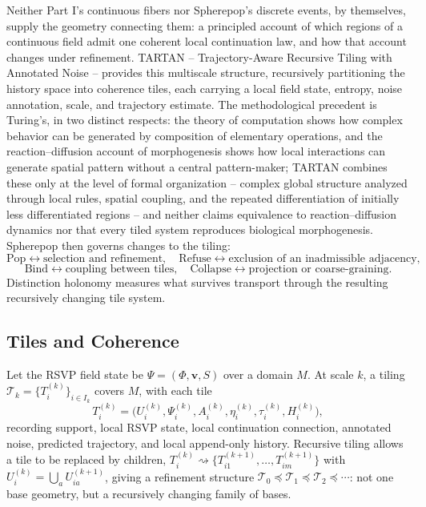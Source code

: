 \documentclass[11pt]{article}
\newcommand{\Pop}{\mathrm{Pop}}
\newcommand{\Refuse}{\mathrm{Refuse}}
\newcommand{\Bind}{\mathrm{Bind}}
\newcommand{\Collapse}{\mathrm{Collapse}}
\begin{document}
Neither Part I's continuous fibers nor Spherepop's discrete events, by themselves, supply the geometry connecting them: a principled account of which regions of a continuous field admit one coherent local continuation law, and how that account changes under refinement. TARTAN -- Trajectory-Aware Recursive Tiling with Annotated Noise -- provides this multiscale structure, recursively partitioning the history space into coherence tiles, each carrying a local field state, entropy, noise annotation, scale, and trajectory estimate. The methodological precedent is Turing's, in two distinct respects: the theory of computation shows how complex behavior can be generated by composition of elementary operations, and the reaction--diffusion account of morphogenesis shows how local interactions can generate spatial pattern without a central pattern-maker; TARTAN combines these only at the level of formal organization -- complex global structure analyzed through local rules, spatial coupling, and the repeated differentiation of initially less differentiated regions -- and neither claims equivalence to reaction--diffusion dynamics nor that every tiled system reproduces biological morphogenesis. Spherepop then governs changes to the tiling:
\[
\Pop \leftrightarrow \text{selection and refinement}, \quad \Refuse \leftrightarrow \text{exclusion of an inadmissible adjacency},
\]
\[
\Bind \leftrightarrow \text{coupling between tiles}, \quad \Collapse \leftrightarrow \text{projection or coarse-graining}.
\]
Distinction holonomy measures what survives transport through the resulting recursively changing tile system.

\subsection{Tiles and Coherence}

Let the RSVP field state be $\Psi = (\Phi, \mathbf{v}, S)$ over a domain $M$. At scale $k$, a tiling $\mathcal{T}_k = \{T_i^{(k)}\}_{i \in I_k}$ covers $M$, with each tile
\[
T_i^{(k)} = \bigl(U_i^{(k)}, \Psi_i^{(k)}, A_i^{(k)}, \eta_i^{(k)}, \tau_i^{(k)}, H_i^{(k)}\bigr),
\]
recording support, local RSVP state, local continuation connection, annotated noise, predicted trajectory, and local append-only history. Recursive tiling allows a tile to be replaced by children, $T_i^{(k)} \rightsquigarrow \{T_{i1}^{(k+1)}, \ldots, T_{im}^{(k+1)}\}$ with $U_i^{(k)} = \bigcup_a U_{ia}^{(k+1)}$, giving a refinement structure $\mathcal{T}_0 \preceq \mathcal{T}_1 \preceq \mathcal{T}_2 \preceq \cdots$: not one base geometry, but a recursively changing family of bases.
\end{document}

